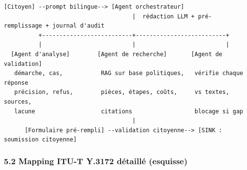 \documentclass[
]{article}
\begin{document}
\begin{verbatim}
[Citoyen] --prompt bilingue--> [Agent orchestrateur]
                                     |  rédaction LLM + pré-remplissage + journal d'audit
          +--------------------------+--------------------------+
          |                          |                          |
  [Agent d'analyse]        [Agent de recherche]       [Agent de validation]
   démarche, cas,           RAG sur base politiques,   vérifie chaque réponse
   précision, refus,        pièces, étapes, coûts,     vs textes, sources,
   lacune                   citations                  blocage si gap
                                     |
      [Formulaire pré-rempli] --validation citoyenne--> [SINK : soumission citoyenne]
\end{verbatim}

\subsubsection{5.2 Mapping ITU-T Y.3172 détaillé
(esquisse)}\label{mapping-itu-t-y.3172-duxe9tailluxe9-esquisse}
\end{document}
